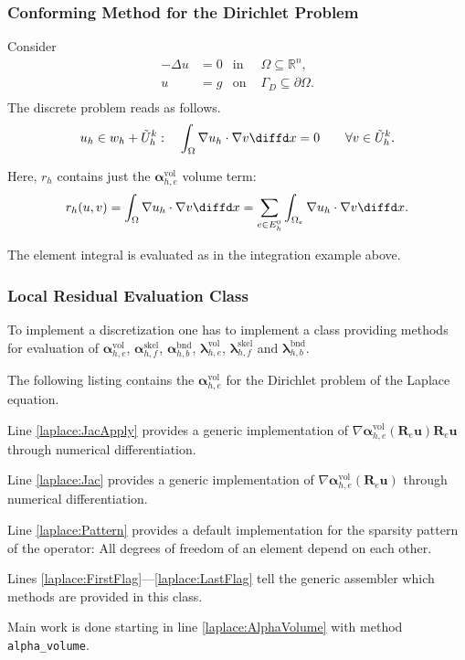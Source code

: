 \begin{frame}
\frametitle<presentation>{Conforming Method for the Dirichlet Problem}
Consider
\begin{subequations}
\begin{align*}
                -\Delta u &= 0& \text{in }& \Omega\subseteq\mathbb{R}^n,\\
                        u &= g& \text{on }& \Gamma_D\subseteq\partial\Omega.\\
\end{align*}
\end{subequations}
The discrete problem reads as follows.
\begin{equation*}
u_h\in w_h+\tilde{U}_h^k : \quad \int_\Omega \nabla u_h \cdot 
\nabla v \diffd x = 0 \qquad \forall v\in \tilde{U}^k_h.
\end{equation*}

Here, $r_h$ contains just the $\bm{\alpha}^\text{vol}_{h,e}$ volume term:
\begin{equation*}
r_h(u,v) = \int_\Omega \nabla u_h\cdot\nabla v \diffd x = \sum_{e\in
E_h^0} \int_{\Omega_e} \nabla u_h\cdot\nabla v \diffd x.  
\end{equation*}

The element integral is evaluated as in the integration example above.
\end{frame}

\begin{frame}
\frametitle<presentation>{Local Residual Evaluation Class}
To implement a discretization one has to implement a class providing
methods for evaluation of $\bm{\alpha}^\text{vol}_{h,e}$,
$\bm{\alpha}^\text{skel}_{h,f}$, $\bm{\alpha}^\text{bnd}_{h,b}$,
$\bm{\lambda}^\text{vol}_{h,e}$, $\bm{\lambda}^\text{skel}_{h,f}$ and
$\bm{\lambda}^\text{bnd}_{h,b}$.

The following listing contains the $\bm{\alpha}^\text{vol}_{h,e}$ for
the Dirichlet problem of the Laplace equation.

Line \ref{laplace:JacApply} provides a generic implementation of
$\nabla \bm{\alpha}^\text{vol}_{h,e}(\mathbf{R}_e\mathbf{u}) \mathbf{R}_e\mathbf{u}$
through numerical differentiation.

Line \ref{laplace:Jac} provides a generic implementation of
$\nabla \bm{\alpha}^\text{vol}_{h,e}(\mathbf{R}_e\mathbf{u})$ through
numerical differentiation.

Line \ref{laplace:Pattern} provides a default implementation for the
sparsity pattern of the operator: All degrees of freedom of an element
depend on each other.

Lines \ref{laplace:FirstFlag}---\ref{laplace:LastFlag} tell the
generic assembler which methods are provided in this class.

Main work is done starting in line \ref{laplace:AlphaVolume} with
method \lstinline{alpha_volume}.
\end{frame}

